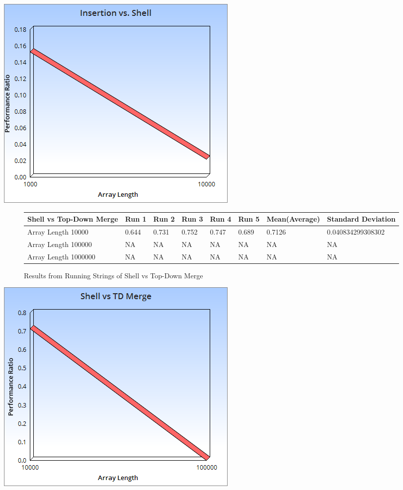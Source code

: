 \documentclass{article}
\begin{document}
\includegraphics[scale=0.5]{String2.png}
\begin{figure}[H]
\centering
\begin{adjustwidth}{-3.4cm}{}
\begin{tabular}{| l | l | l | l | l | l | l | l |}
\hline
Shell vs Top-Down Merge & Run 1 & Run 2 & Run 3 & Run 4 & Run 5 & Mean(Average) & Standard Deviation\\ \hline
Array Length 10000 & 0.644 & 0.731 & 0.752 & 0.747 & 0.689 & 0.7126 & 0.040834299308302  \\ \hline
Array Length 100000 & NA & NA & NA & NA & NA & NA &  NA\\ \hline
Array Length 1000000 & NA & NA & NA & NA & NA & NA & NA \\ \hline
\end{tabular}
\caption{Results from Running  Strings of Shell vs Top-Down Merge}
\end{adjustwidth}
\end{figure}
\includegraphics[scale=0.5]{String3.png}
\end{document}
